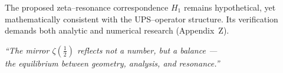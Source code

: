 \noindent
The proposed zeta–resonance correspondence $H_1$ remains hypothetical, yet mathematically consistent with the UPS–operator structure.
Its verification demands both analytic and numerical research (Appendix~Z).

\begin{flushright}
\textit{“The mirror $\zeta(\tfrac12)$ reflects not a number, but a balance — \\
the equilibrium between geometry, analysis, and resonance.”}
\end{flushright}


